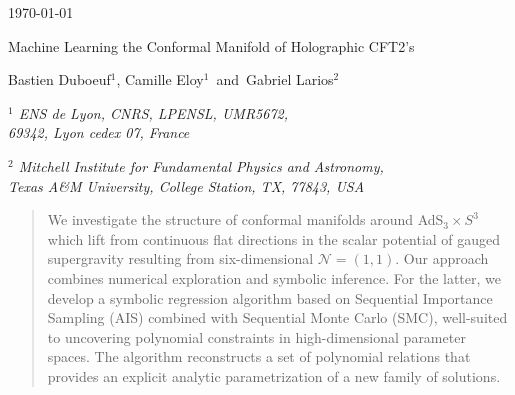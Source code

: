 \documentclass[11pt,a4paper]{article}
\begin{document}
\begin{titlepage}



\begin{flushright}

\today
\end{flushright}


\vspace{25pt}

   
   \begin{center}
   \baselineskip=16pt

{\Large Machine Learning the Conformal Manifold of Holographic CFT2’s}


   		
\vspace{25pt}
		

{\large  Bastien Duboeuf$^{1}$, Camille Eloy$^{1}$ \,and\, Gabriel Larios$^{2}$}
		
\vspace{25pt}
		
		
	\begin{small}

	{\it $^{1}$ ENS de Lyon, CNRS, LPENSL, UMR5672,\\ 69342, Lyon cedex 07, France}  \\


	\vspace{10pt}
	
	{\it $^{2}$ Mitchell Institute for Fundamental Physics and Astronomy, \\
	Texas A\&M University, College Station, TX, 77843, USA}     \\
		
	\end{small}
		

\vskip 50pt

\end{center}

\begin{abstract}
	We investigate the structure of conformal manifolds around AdS$_3 \times S^3$ which lift from continuous flat directions in the scalar potential of gauged supergravity resulting from six-dimensional $\mathcal{N}=(1,1)$.
	Our approach combines numerical exploration and symbolic inference. For the latter, we develop a symbolic regression algorithm based on Sequential Importance Sampling (AIS) combined with Sequential Monte Carlo (SMC), well-suited to uncovering polynomial constraints in high-dimensional parameter spaces. 
	The algorithm reconstructs a set of polynomial relations that provides an explicit analytic parametrization of a new family of solutions. 
\end{abstract}


\vfill

\end{titlepage}
\end{document}
